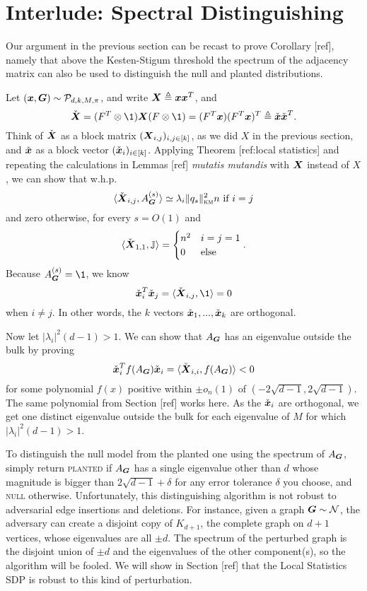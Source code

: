 \section{Interlude: Spectral Distinguishing}

Our argument in the previous section can be recast to prove Corollary [ref], namely that above the Kesten-Stigum threshold the spectrum of the adjacency matrix can also be used to distinguish the null and planted distributions. 

Let $({\boldsymbol{x}},\boldsymbol{G}) \sim \mathcal{P}_{d,k,M,\pi}$, and write $\boldsymbol{X} \triangleq {\boldsymbol{x}} {\boldsymbol{x}}^T$, and 
$$
 \check \bX = (F^T \otimes \1)\bX (F \otimes \1) = (F^T \bx)(F^T\bx)^T \triangleq \check \bx \check \bx^T.
$$ 
Think of $\check {\boldsymbol{X}}$ as a block matrix $(\boldsymbol{X}_{i,j})_{i,j \in [k]}$, as we did $X$ in the previous section, and $\check {{\boldsymbol{x}}}$ as a block vector $(\check {{\boldsymbol{x}}}_i)_{i\in [k]}$. Applying Theorem [ref:local statistics] and repeating the calculations in Lemmas [ref] \textit{mutatis mutandis} with $\boldsymbol{X}$ instead of $X$, we can show  that w.h.p.
$$
    \langle \check {\boldsymbol{X}}_{i,j}, A^{(s)}_{\boldsymbol{G}} \rangle \simeq \lambda_i \|q_s\|^2_{\textsc{km}} n \text{ if $i=j$}
$$
and zero otherwise, for every $s = O(1)$ and
$$
    \langle \check {\boldsymbol{X}}_{1,1}, \mathbb{J} \rangle = \begin{cases} n^2 & i=j=1 \\ 0 & \text{else} \end{cases}.
$$
Because $\nb{s}{\bG} =\1$, we know 
$$
    \check \bx_i^T \check \bx_j = \langle \check \bX_{i,j}, \1 \rangle = 0
$$
when $i\neq j$. In other words, the $k$ vectors $\check {{\boldsymbol{x}}}_1,...,\check {{\boldsymbol{x}}}_k$ are orthogonal.

Now let $|\lambda_i|^2(d-1) > 1$. We can show that $A_{\boldsymbol{G}}$ has an eigenvalue outside the bulk by proving 
$$
\check{{\boldsymbol{x}}}_i^T f(A_{\boldsymbol{G}})\check{{\boldsymbol{x}}}_i = \langle \check {\boldsymbol{X}}_{i,i}, f(A_{\boldsymbol{G}}) \rangle < 0
$$ 
for some polynomial $f(x)$ positive within $\pm o_n(1)$ of $(-2\sqrt{d-1},2\sqrt{d-1})$. The same polynomial from Section [ref] works here. As the $\check {{\boldsymbol{x}}}_i$ are orthogonal, we get one distinct eigenvalue outside the bulk for each eigenvalue of $M$ for which $|\lambda_i|^2(d-1) > 1$.

\begin{remark}
    To distinguish the null model from the planted one using the spectrum of $A_{\boldsymbol{G}}$, simply return \textsc{planted} if $A_{\boldsymbol{G}}$ has a single eigenvalue other than $d$ whose magnitude is bigger than $2\sqrt{d-1} + \delta$ for any error tolerance $\delta$ you choose, and \textsc{null} otherwise. Unfortunately, this distinguishing algorithm is not robust to adversarial edge insertions and deletions. For instance, given a graph $\boldsymbol{G} \sim \mathcal{N}$, the adversary can create a disjoint copy of $K_{d+1}$, the complete graph on $d+1$ vertices, whose eigenvalues are all $\pm d$. The spectrum of the perturbed graph is the disjoint union of $\pm d$ and the eigenvalues of the other component(s), so the algorithm will be fooled.  We will show in Section [ref] that the Local Statistics SDP is robust to this kind of perturbation.
\end{remark}